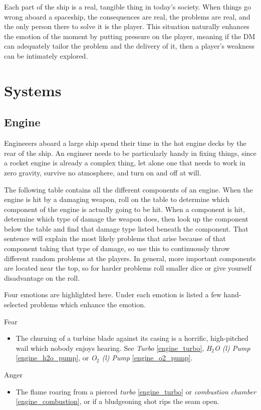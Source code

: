 \documentclass[a4paper]{article}
\begin{document}
Each part of the ship is a real, tangible thing in today's society. When things go wrong aboard a spaceship, the consequences are real, the problems are real, and the only person there to solve it is the player. This situation naturally enhances the emotion of the moment by putting pressure on the player, meaning if the DM can adequately tailor the problem and the delivery of it, then a player's weakness can be intimately explored.

\section{Systems} \label{systems}

\subsection{Engine} \label{engine}

Engineeers aboard a large ship spend their time in the hot engine decks by the rear of the ship. An engineer needs to be particularly handy in fixing things, since a rocket engine is already a complex thing, let alone one that needs to work in zero gravity, survive no atmosphere, and turn on and off at will.

The following table contains all the different components of an engine. When the engine is hit by a damaging weapon, roll on the table to determine which component of the engine is actually going to be hit. When a component is hit, determine which type of damage the weapon does, then look up the component below the table and find that damage type listed beneath the component. That sentence will explain the most likely problems that arise because of that component taking that type of damage, so use this to continuously throw different random problems at the players. In general, more important components are located near the top, so for harder problems roll smaller dice or give yourself disadvantage on the roll.

Four emotions are highlighted here. Under each emotion is listed a few hand-selected problems which enhance the emotion.

\vspace{0.3cm}
\begin{minipage}[t]{0.4\linewidth}
Fear
\begin{itemize}
\item The churning of a turbine blade against its casing is a horrific, high-pitched wail which nobody enjoys hearing. See \textit{Turbo} \ref{engine_turbo}, \textit{H$_2$O (l) Pump} \ref{engine_h2o_pump}, or \textit{O$_2$ (l) Pump} \ref{engine_o2_pump}.
\end{itemize}
\end{minipage} 
\begin{minipage}[t]{0.4\linewidth}
Anger
\begin{itemize}
\item The flame roaring from a pierced \textit{turbo} \ref{engine_turbo} or \textit{combustion chamber} \ref{engine_combustion}, or if a bludgeoning shot rips the seam open. 
\end{itemize}
\end{minipage}
\end{document}
